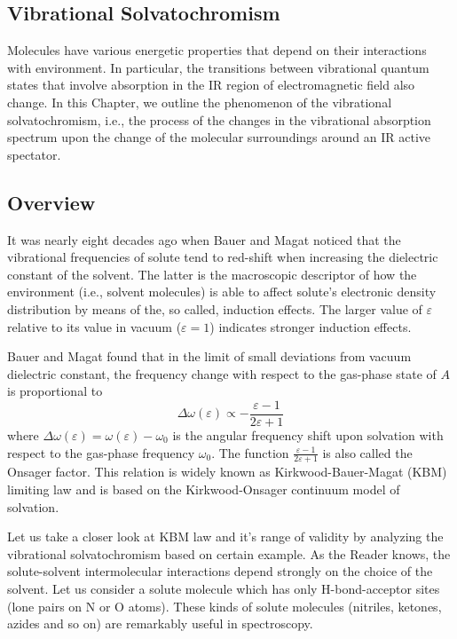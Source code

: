 \documentclass[a4paper,titlepage,twoside,fleqn,12pt]{book}
\begin{document}
\begin{refsection}
\chapter{Vibrational Solvatochromism\label{c:vibr-solv}}

Molecules have various energetic properties that 
depend on their interactions with environment. In particular,
the transitions between vibrational quantum states
that involve absorption in the IR region of 
electromagnetic field also change. 
In this Chapter, we outline the phenomenon 
of the vibrational solvatochromism, i.e., the process of
the changes in the vibrational absorption spectrum upon the change 
of the molecular surroundings around an IR active spectator.

\section{Overview}
%
It was nearly eight decades ago when Bauer and Magat noticed 
that the vibrational frequencies
of solute tend to red-shift when
increasing the dielectric constant of the solvent.\citep{Bauer.Magat.JPhysRadium.1938} 
The latter is the macroscopic descriptor 
of how the environment (i.e., solvent molecules) is able to affect solute's 
electronic density distribution by means of the, so called, induction
effects. The larger value of $\varepsilon$ relative to its value in vacuum
($\varepsilon=1$) indicates stronger induction effects. 

Bauer and Magat found that in the limit of small deviations
from vacuum dielectric constant, the frequency change with respect to the
gas-phase state of $A$ is proportional to
%
\begin{equation} \label{e:kbm}
\Delta \omega(\varepsilon) \propto - \frac{\varepsilon-1}{2\varepsilon+1}
\end{equation}
%
where $\Delta\omega(\varepsilon) = \omega(\varepsilon) - \omega_0$ is the
angular frequency shift upon solvation with respect to the gas-phase frequency
$\omega_0$. The function $\frac{\varepsilon-1}{2\varepsilon+1}$ is also called
the Onsager factor. This relation is widely known as Kirkwood-Bauer-Magat (KBM) 
limiting law and is based on the Kirkwood-Onsager continuum model of 
solvation.\citep{Kirkwood.JCP.1934,Onsager.JACS.1936}

Let us take a closer look at KBM law and it's range of validity by analyzing the vibrational
solvatochromism based on certain example. As the Reader knows, the solute\hyp{}solvent intermolecular interactions 
depend strongly on the choice of the solvent.\citep{Stone.TheTheoryOfIntermolecularForces.1996,Gutmann.Resch.Linert.CoordChemRev.1982} 
Let us consider a solute molecule which has
only H\hyp{}bond\hyp{}acceptor sites (lone pairs on N or O atoms). These kinds of solute molecules
(nitriles, ketones, azides and so on) are remarkably useful in spectroscopy.


\end{refsection}
\end{document}
